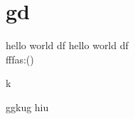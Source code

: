 \documentclass{article}
\begin{document}
\section{gd}
	hello world df \textbf{\gitRel}
	hello world df \textbf{\gitRel}\\
	fffas:\gitRoff(\gitCommitterDate)\\
	\newpage
	\begin{changelog}[author=Michele]
		\begin{version}[version=1.20]
			\added
			\item k
		\end{version}
		\begin{version}[version=\gitReln]
		\added
		\item ggkug hiu 
	\end{version}
	\end{changelog}
\end{document}
